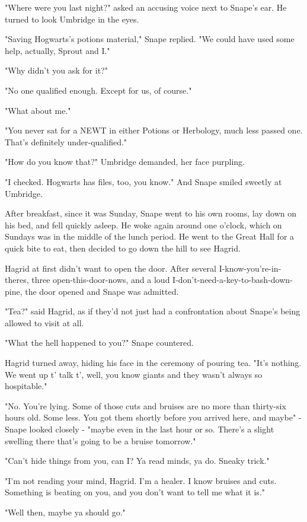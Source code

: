 "Where were you last night?" asked an accusing voice next to Snape's ear. He turned to look Umbridge in the eyes.

"Saving Hogwarts's potions material," Snape replied. "We could have used some help, actually, Sprout and I."

"Why didn't you ask for it?"

"No one qualified enough. Except for us, of course."

"What about me."

"You never sat for a NEWT in either Potions or Herbology, much less passed one. That's definitely under-qualified."

"How do you know that?" Umbridge demanded, her face purpling.

"I checked. Hogwarts has files, too, you know." And Snape smiled sweetly at Umbridge.

After breakfast, since it was Sunday, Snape went to his own rooms, lay down on his bed, and fell quickly asleep. He woke again around one o'clock, which on Sundays was in the middle of the lunch period. He went to the Great Hall for a quick bite to eat, then decided to go down the hill to see Hagrid.

Hagrid at first didn't want to open the door. After several I-know-you're-in-theres, three open-this-door-nows, and a loud I-don't-need-a-key-to-bash-down-pine, the door opened and Snape was admitted.

"Tea?" said Hagrid, as if they'd not just had a confrontation about Snape's being allowed to visit at all.

"What the hell happened to you?" Snape countered.

Hagrid turned away, hiding his face in the ceremony of pouring tea. "It's nothing. We went up t' talk t', well, you know{\el} giants{\el} and they wasn't always so hospitable."

"No. You're lying. Some of those cuts and bruises are no more than thirty-six hours old. Some less. You got them shortly before you arrived here, and maybe{\el}" - Snape looked closely - "maybe even in the last hour or so. There's a slight swelling there that's going to be a bruise tomorrow."

"Can't hide things from you, can I? Ya read minds, ya do. Sneaky trick."

"I'm not reading your mind, Hagrid. I'm a healer. I know bruises and cuts. Something is beating on you, and you don't want to tell me what it is."

"Well then, maybe ya should go."

